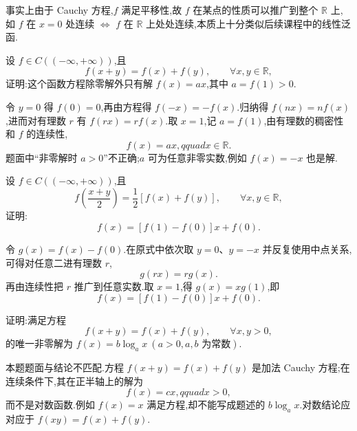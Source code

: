 \begin{remark}
    事实上由于 Cauchy 方程,$f$ 满足平移性,故 $f$ 在某点的性质可以推广到整个 $\mathbb{R}$ 上,如 $f$ 在 $x=0$ 处连续 $\Longleftrightarrow$ $f$ 在 $\mathbb{R}$ 上处处连续,本质上十分类似后续课程中的线性泛函.
\end{remark}

\begin{example}
    设 $f\in C(( -\infty,+\infty))$,且
    \[
        f(x+y)=f(x)+f(y),
        \qquad \forall x,y\in\mathbb{R},
    \]
    证明:这个函数方程除零解外只有解 $f(x)=ax$,其中 $a=f(1)>0$.
\end{example}
\exampleblank

\begin{solution}
    令 $y=0$ 得 $f(0)=0$,再由方程得 $f(-x)=-f(x)$.归纳得 $f(nx)=nf(x)$,进而对有理数 $r$ 有 $f(rx)=rf(x)$.取 $x=1$,记 $a=f(1)$,由有理数的稠密性和 $f$ 的连续性,
    \[
        f(x)=ax,qquad x\in\mathbb R.
    \]
    题面中“非零解时 $a>0$”不正确;$a$ 可为任意非零实数,例如 $f(x)=-x$ 也是解.
\end{solution}

\begin{example}
    设 $f\in C(( -\infty,+\infty))$,且
    \[
        f\left(\dfrac{x+y}{2}\right)=\dfrac{1}{2}[f(x)+f(y)],
        \qquad \forall x,y\in\mathbb{R},
    \]
    证明:
    \[
        f(x)=[f(1)-f(0)]x+f(0).
    \]
\end{example}
\exampleblank

\begin{solution}
    令 $g(x)=f(x)-f(0)$.在原式中依次取 $y=0$、$y=-x$ 并反复使用中点关系,可得对任意二进有理数 $r$,
    \[
        g(rx)=rg(x).
    \]
    再由连续性把 $r$ 推广到任意实数.取 $x=1$,得 $g(x)=xg(1)$,即
    \[
        f(x)=[f(1)-f(0)]x+f(0).
    \]
\end{solution}

\begin{example}
    证明:满足方程
    \[
        f(x+y)=f(x)+f(y),
        \qquad \forall x,y>0,
    \]
    的唯一非零解为 $f(x)=b\log_a x\ (a>0,a,b\text{ 为常数})$.
\end{example}
\exampleblank

\begin{solution}
    本题题面与结论不匹配.方程 $f(x+y)=f(x)+f(y)$ 是加法 Cauchy 方程;在连续条件下,其在正半轴上的解为
    \[
        f(x)=cx,qquad x>0,
    \]
    而不是对数函数.例如 $f(x)=x$ 满足方程,却不能写成题述的 $b\log_a x$.对数结论应对应于 $f(xy)=f(x)+f(y)$.
\end{solution}

